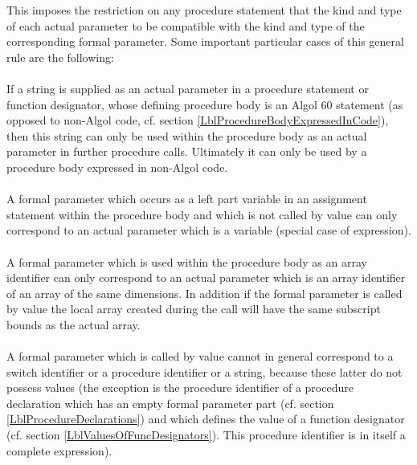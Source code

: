\documentclass[a4paper,11pt]{article}
\begin{document}
This imposes the restriction on any procedure statement that the kind
and type of each actual parameter to be compatible with the kind and
type of the corresponding formal parameter.  Some important particular
cases of this general rule are the following:

\paragraph{} \label{LblProcedureStatementsRestrictionsP1}
If a string is supplied as an actual parameter in a procedure
statement or function designator, whose defining procedure body is an
Algol 60 statement (as opposed to non-Algol code, cf. section
\ref{LblProcedureBodyExpressedInCode}), then this string can only be
used within the procedure body as an actual parameter in further
procedure calls.  Ultimately it can only be used by a procedure body
expressed in non-Algol code.

\paragraph{} \label{LblProcedureStatementsRestrictionsP2}
A formal parameter which occurs as a left part variable in an
assignment statement within the procedure body and which is not called
by value can only correspond to an actual parameter which is a
variable (special case of expression).

\paragraph{} \label{LblProcedureStatementsRestrictionsP3}
A formal parameter which is used within the procedure body as an array
identifier can only correspond to an actual parameter which is an
array identifier of an array of the same dimensions.  In addition if
the formal parameter is called by value the local array created during
the call will have the same subscript bounds as the actual array.

\paragraph{} \label{LblProcedureStatementsRestrictionsP4}
A formal parameter which is called by value cannot in general
correspond to a switch identifier or a procedure identifier or a
string, because these latter do not possess values (the exception is
the procedure identifier of a procedure declaration which has an empty
formal parameter part (cf. section \ref{LblProcedureDeclarations}) and
which defines the value of a function designator (cf. section
\ref{LblValuesOfFuncDesignators}).  This procedure identifier is in
itself a complete expression).
\end{document}
